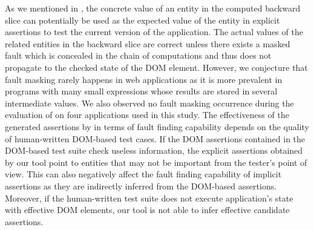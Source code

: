  As we mentioned in , the concrete value of an entity in the computed backward slice can potentially be used as the expected value of the entity in explicit assertions to test the current version of the application.
The actual values of the related entities in the backward slice are correct unless there exists a masked fault which is concealed in the chain of computations and thus does not propagate to the checked state of the DOM element. However, we conjecture that fault masking rarely happens in \javascript web applications as it is more prevalent in programs with many small expressions whose results are stored in several intermediate values. We also observed no fault masking occurrence during the evaluation of \tool on four \javascript applications used in this study.
 The effectiveness of the generated assertions by \tool in terms of fault finding capability depends on the quality of human-written DOM-based test cases. If the DOM assertions contained in the DOM-based test suite check useless information, the explicit assertions obtained by our tool point to entities that may not be important from the tester's point of view. This can also negatively affect the fault finding capability of implicit assertions as they are indirectly inferred from the DOM-based assertions. Moreover, if the human-written test suite does not execute application's state with effective DOM elements, our tool is not able to infer effective candidate assertions.   